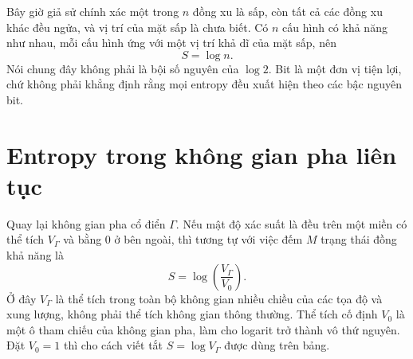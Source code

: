 Bây giờ giả sử chính xác một trong \(n\) đồng xu là sấp, còn tất cả các đồng xu khác đều ngửa, và vị trí của mặt sấp là chưa biết. Có \(n\) cấu hình có khả năng như nhau, mỗi cấu hình ứng với một vị trí khả dĩ của mặt sấp, nên
\begin{equation}
 S=\log n.
 \label{eq:sm1-one-tail-entropy}
\end{equation}
Nói chung đây không phải là bội số nguyên của \(\log2\). Bit là một đơn vị tiện lợi, chứ không phải khẳng định rằng mọi entropy đều xuất hiện theo các bậc nguyên bit.

\begin{classroomqa}
\end{classroomqa}

\begin{classroomqa}
\end{classroomqa}

\section{Entropy trong không gian pha liên tục}

Quay lại không gian pha cổ điển \(\Gamma\). Nếu mật độ xác suất là đều trên một miền có thể tích \(V_\Gamma\) và bằng 0 ở bên ngoài, thì tương tự với việc đếm \(M\) trạng thái đồng khả năng là
\begin{equation}
 S=\log\!\left(\frac{V_\Gamma}{V_0}\right).
 \label{eq:sm1-continuous-uniform}
\end{equation}
Ở đây \(V_\Gamma\) là thể tích trong toàn bộ không gian nhiều chiều của các tọa độ và xung lượng, không phải thể tích không gian thông thường. Thể tích cố định \(V_0\) là một ô tham chiếu của không gian pha, làm cho logarit trở thành vô thứ nguyên. Đặt \(V_0=1\) thì cho cách viết tắt \(S=\log V_\Gamma\) được dùng trên bảng.

